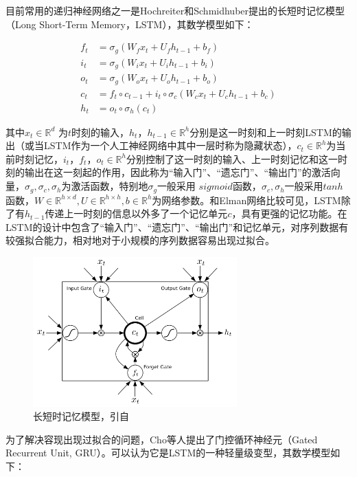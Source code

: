 目前常用的递归神经网络之一是Hochreiter和Schmidhuber\cite{hochreiter1997long}提出的长短时记忆模型（Long Short-Term Memory，LSTM），其数学模型如下：

\begin{align}
  \label{eq:lstm}
  f_t &= \sigma_g(W_f x_t + U_f h_{t - 1} + b_f) \\
  i_t &= \sigma_g(W_i x_t + U_i h_{t - 1} + b_i) \\
  o_t &= \sigma_g(W_o x_t + U_o h_{t - 1} + b_o) \\
  c_t &= f_t \circ c_{t-1} + i_t \circ \sigma_c (W_c x_t + U_c h_{t-1} + b_c) \\
  h_t &= o_t \circ \sigma_h (c_t)
\end{align}

其中$x_t \in \mathbb{R}^d$ 为$t$时刻的输入，$h_t$，$h_{t-1} \in \mathbb{R}^h$分别是这一时刻和上一时刻LSTM的输出（或当LSTM作为一个人工神经网络中其中一层时称为隐藏状态），$c_t \in \mathbb{R}^h$为当前时刻记忆，$i_t$，$f_t$，$o_t \in \mathbb{R}^h$分别控制了这一时刻的输入、上一时刻记忆和这一时刻的输出在这一刻起的作用，因此称为“输入门”、“遗忘门”、“输出门”的激活向量，$\sigma_g, \sigma_c, \sigma_h$为激活函数，特别地$\sigma_g$一般采用 $sigmoid$函数，$\sigma_c, \sigma_h$一般采用$tanh$函数，$W \in \mathbb{R} ^ {h \times d}, U \in \mathbb{R}^{h \times h}, b \in \mathbb{R} ^ {h}$为网络参数。和Elman网络比较可见，LSTM除了有$h_{t-1}$传递上一时刻的信息以外多了一个记忆单元$c$，具有更强的记忆功能。在LSTM的设计中包含了“输入门”、“遗忘门”、“输出门”和记忆单元，对序列数据有较强拟合能力，相对地对于小规模的序列数据容易出现过拟合。

\begin{figure}[H]
  \centering
  \includegraphics[width=0.7\textwidth]{img/lstm.png}
  \caption{长短时记忆模型，引自\cite{graves2013hybrid}}
  \label{fig:lstm}
\end{figure}

为了解决容现出现过拟合的问题，Cho等人\cite{cho2014learning}提出了门控循环神经元（Gated Recurrent Unit, GRU）。可以认为它是LSTM的一种轻量级变型，其数学模型如下：

